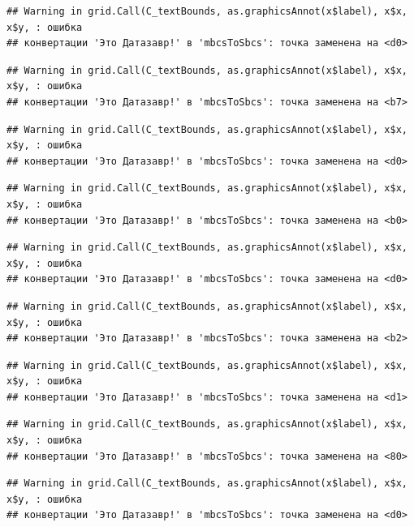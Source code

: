 \documentclass[]{book}
\begin{document}
\begin{verbatim}
## Warning in grid.Call(C_textBounds, as.graphicsAnnot(x$label), x$x, x$y, : ошибка
## конвертации 'Это Датазавр!' в 'mbcsToSbcs': точка заменена на <d0>
\end{verbatim}

\begin{verbatim}
## Warning in grid.Call(C_textBounds, as.graphicsAnnot(x$label), x$x, x$y, : ошибка
## конвертации 'Это Датазавр!' в 'mbcsToSbcs': точка заменена на <b7>
\end{verbatim}

\begin{verbatim}
## Warning in grid.Call(C_textBounds, as.graphicsAnnot(x$label), x$x, x$y, : ошибка
## конвертации 'Это Датазавр!' в 'mbcsToSbcs': точка заменена на <d0>
\end{verbatim}

\begin{verbatim}
## Warning in grid.Call(C_textBounds, as.graphicsAnnot(x$label), x$x, x$y, : ошибка
## конвертации 'Это Датазавр!' в 'mbcsToSbcs': точка заменена на <b0>
\end{verbatim}

\begin{verbatim}
## Warning in grid.Call(C_textBounds, as.graphicsAnnot(x$label), x$x, x$y, : ошибка
## конвертации 'Это Датазавр!' в 'mbcsToSbcs': точка заменена на <d0>
\end{verbatim}

\begin{verbatim}
## Warning in grid.Call(C_textBounds, as.graphicsAnnot(x$label), x$x, x$y, : ошибка
## конвертации 'Это Датазавр!' в 'mbcsToSbcs': точка заменена на <b2>
\end{verbatim}

\begin{verbatim}
## Warning in grid.Call(C_textBounds, as.graphicsAnnot(x$label), x$x, x$y, : ошибка
## конвертации 'Это Датазавр!' в 'mbcsToSbcs': точка заменена на <d1>
\end{verbatim}

\begin{verbatim}
## Warning in grid.Call(C_textBounds, as.graphicsAnnot(x$label), x$x, x$y, : ошибка
## конвертации 'Это Датазавр!' в 'mbcsToSbcs': точка заменена на <80>
\end{verbatim}

\begin{verbatim}
## Warning in grid.Call(C_textBounds, as.graphicsAnnot(x$label), x$x, x$y, : ошибка
## конвертации 'Это Датазавр!' в 'mbcsToSbcs': точка заменена на <d0>
\end{verbatim}
\end{document}
